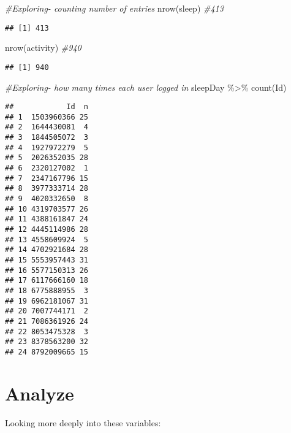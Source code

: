 \documentclass[
]{article}
\newenvironment{Shaded}{\begin{snugshade}}{\end{snugshade}}
\newcommand{\CommentTok}[1]{\textcolor[rgb]{0.56,0.35,0.01}{\textit{#1}}}
\newcommand{\FunctionTok}[1]{\textcolor[rgb]{0.00,0.00,0.00}{#1}}
\newcommand{\NormalTok}[1]{#1}
\newcommand{\SpecialCharTok}[1]{\textcolor[rgb]{0.00,0.00,0.00}{#1}}
\begin{document}
\begin{Shaded}
\begin{Highlighting}[]
\CommentTok{\#Exploring{-} counting number of entries}
\FunctionTok{nrow}\NormalTok{(sleep) }\CommentTok{\#413}
\end{Highlighting}
\end{Shaded}

\begin{verbatim}
## [1] 413
\end{verbatim}

\begin{Shaded}
\begin{Highlighting}[]
\FunctionTok{nrow}\NormalTok{(activity) }\CommentTok{\#940}
\end{Highlighting}
\end{Shaded}

\begin{verbatim}
## [1] 940
\end{verbatim}

\begin{Shaded}
\begin{Highlighting}[]
\CommentTok{\#Exploring{-} how many times each user logged in}
\NormalTok{sleepDay }\SpecialCharTok{\%\textgreater{}\%} \FunctionTok{count}\NormalTok{(Id)}
\end{Highlighting}
\end{Shaded}

\begin{verbatim}
##            Id  n
## 1  1503960366 25
## 2  1644430081  4
## 3  1844505072  3
## 4  1927972279  5
## 5  2026352035 28
## 6  2320127002  1
## 7  2347167796 15
## 8  3977333714 28
## 9  4020332650  8
## 10 4319703577 26
## 11 4388161847 24
## 12 4445114986 28
## 13 4558609924  5
## 14 4702921684 28
## 15 5553957443 31
## 16 5577150313 26
## 17 6117666160 18
## 18 6775888955  3
## 19 6962181067 31
## 20 7007744171  2
## 21 7086361926 24
## 22 8053475328  3
## 23 8378563200 32
## 24 8792009665 15
\end{verbatim}

\hypertarget{analyze}{%
\section{Analyze}\label{analyze}}

Looking more deeply into these variables:
\end{document}
